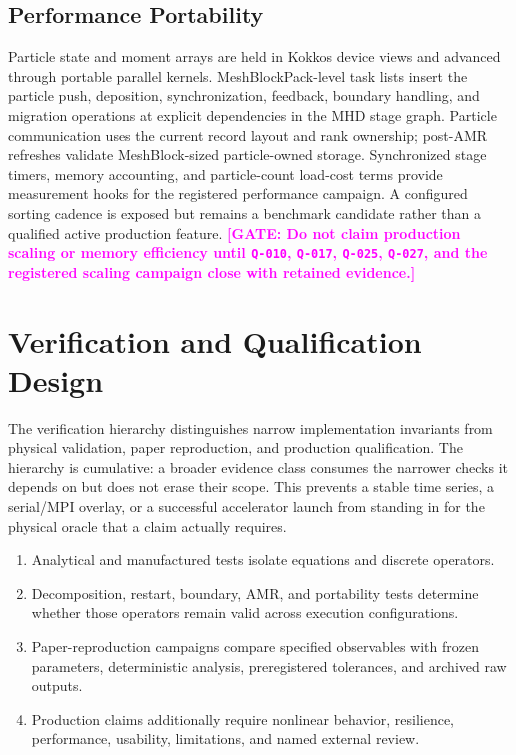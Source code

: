 \documentclass[twocolumn]{aastex701}
\newcommand{\GATE}[1]{\textcolor{magenta}{\textbf{[GATE: #1]}}}
\newcommand{\qgate}[1]{\texttt{#1}}
\begin{document}
\subsection{Performance Portability}

Particle state and moment arrays are held in Kokkos device views and advanced
through portable parallel kernels. MeshBlockPack-level task lists insert the
particle push, deposition, synchronization, feedback, boundary handling, and
migration operations at explicit dependencies in the MHD stage graph.
Particle communication uses the current record layout and rank ownership;
post-AMR refreshes validate MeshBlock-sized particle-owned storage.
Synchronized stage timers, memory accounting, and particle-count load-cost
terms provide measurement hooks for the registered performance campaign.
A configured sorting cadence is exposed but remains a benchmark candidate
rather than a qualified active production feature.
\GATE{Do not claim production scaling or memory efficiency until
\qgate{Q-010}, \qgate{Q-017}, \qgate{Q-025}, \qgate{Q-027}, and the registered
scaling campaign close with retained evidence.}

\section{Verification and Qualification Design}
\label{sec:verification-design}

The verification hierarchy distinguishes narrow implementation invariants
from physical validation, paper reproduction, and production qualification.
The hierarchy is cumulative: a broader evidence class consumes the narrower
checks it depends on but does not erase their scope. This prevents a stable
time series, a serial/MPI overlay, or a successful accelerator launch from
standing in for the physical oracle that a claim actually requires.

\begin{enumerate}
\item Analytical and manufactured tests isolate equations and discrete
operators.
\item Decomposition, restart, boundary, AMR, and portability tests determine
whether those operators remain valid across execution configurations.
\item Paper-reproduction campaigns compare specified observables with frozen
parameters, deterministic analysis, preregistered tolerances, and archived raw
outputs.
\item Production claims additionally require nonlinear behavior, resilience,
performance, usability, limitations, and named external review.
\end{enumerate}
\end{document}
